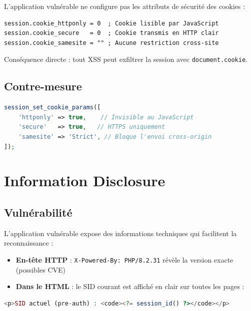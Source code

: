 \documentclass[12pt,a4paper]{report}
\begin{document}
L'application vulnérable ne configure pas les attributs de sécurité des cookies :

\begin{lstlisting}[caption={Configuration PHP vulnérable}]
session.cookie_httponly = 0  ; Cookie lisible par JavaScript
session.cookie_secure   = 0  ; Cookie transmis en HTTP clair
session.cookie_samesite = "" ; Aucune restriction cross-site
\end{lstlisting}

Conséquence directe : tout XSS peut exfiltrer la session avec \texttt{document.cookie}.

\subsection{Contre-mesure}

\begin{securebox}[Cookies]
\begin{lstlisting}[language=PHP, caption={Configuration des cookies sécurisés}]
session_set_cookie_params([
    'httponly' => true,    // Invisible au JavaScript
    'secure'   => true,   // HTTPS uniquement
    'samesite' => 'Strict', // Bloque l'envoi cross-origin
]);
\end{lstlisting}
\end{securebox}

\section{Information Disclosure}

\subsection{Vulnérabilité}

L'application vulnérable expose des informations techniques qui facilitent la reconnaissance :

\begin{itemize}
  \item \textbf{En-tête HTTP} : \texttt{X-Powered-By: PHP/8.2.31} révèle la version exacte (possibles CVE)
  \item \textbf{Dans le HTML} : le SID courant est affiché en clair sur toutes les pages :
\end{itemize}

\begin{lstlisting}[language=PHP, caption={SID affiché en clair dans login.php}]
<p>SID actuel (pre-auth) : <code><?= session_id() ?></code></p>
\end{lstlisting}
\end{document}
